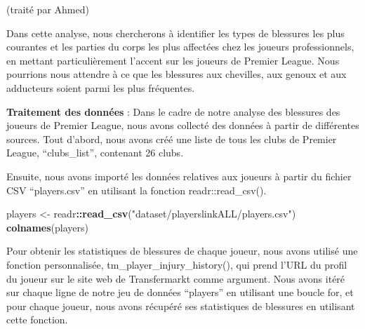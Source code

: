 \documentclass[
]{article}
\newenvironment{Shaded}{\begin{snugshade}}{\end{snugshade}}
\newcommand{\FunctionTok}[1]{\textcolor[rgb]{0.13,0.29,0.53}{\textbf{#1}}}
\newcommand{\NormalTok}[1]{#1}
\newcommand{\OtherTok}[1]{\textcolor[rgb]{0.56,0.35,0.01}{#1}}
\newcommand{\SpecialCharTok}[1]{\textcolor[rgb]{0.81,0.36,0.00}{\textbf{#1}}}
\newcommand{\StringTok}[1]{\textcolor[rgb]{0.31,0.60,0.02}{#1}}
\begin{document}
(traité par Ahmed)

Dans cette analyse, nous chercherons à identifier les types de blessures
les plus courantes et les parties du corps les plus affectées chez les
joueurs professionnels, en mettant particulièrement l'accent sur les
joueurs de Premier League. Nous pourrions nous attendre à ce que les
blessures aux chevilles, aux genoux et aux adducteurs soient parmi les
plus fréquentes.

\textbf{Traitement des données} : Dans le cadre de notre analyse des
blessures des joueurs de Premier League, nous avons collecté des données
à partir de différentes sources. Tout d'abord, nous avons créé une liste
de tous les clubs de Premier League, ``clubs\_list'', contenant 26
clubs.

Ensuite, nous avons importé les données relatives aux joueurs à partir
du fichier CSV ``players.csv'' en utilisant la fonction
readr::read\_csv().

\begin{Shaded}
\begin{Highlighting}[]
\NormalTok{players }\OtherTok{\textless{}{-}}\NormalTok{ readr}\SpecialCharTok{::}\FunctionTok{read\_csv}\NormalTok{(}\StringTok{"dataset/playerslinkALL/players.csv"}\NormalTok{)}
\FunctionTok{colnames}\NormalTok{(players)}
\end{Highlighting}
\end{Shaded}

Pour obtenir les statistiques de blessures de chaque joueur, nous avons
utilisé une fonction personnalisée, tm\_player\_injury\_history(), qui
prend l'URL du profil du joueur sur le site web de Transfermarkt comme
argument. Nous avons itéré sur chaque ligne de notre jeu de données
``players'' en utilisant une boucle for, et pour chaque joueur, nous
avons récupéré ses statistiques de blessures en utilisant cette
fonction.
\end{document}
